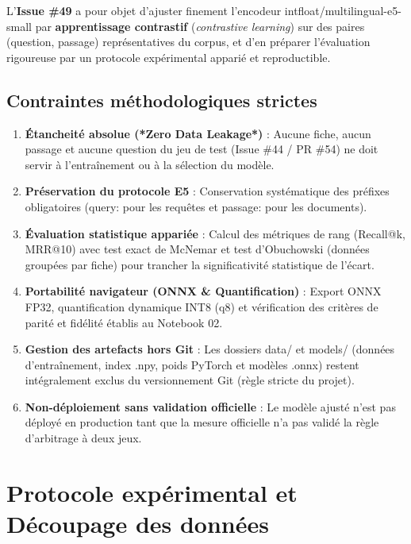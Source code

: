 \documentclass[11pt,a4paper]{article}
\newcommand{\code}[1]  {{\ttfamily #1}}
\newcommand{\rulebreak}{}
\begin{document}
L'\textbf{Issue \#49} a pour objet d'ajuster finement l'encodeur \code{intfloat/\allowbreak{}multilingual-\allowbreak{}e5-\allowbreak{}small} par \textbf{apprentissage contrastif} (\textit{contrastive learning}) sur des paires \code{(question, passage)} représentatives du corpus, et d'en préparer l'évaluation rigoureuse par un protocole expérimental apparié et reproductible.

\subsection{Contraintes méthodologiques strictes}
\begin{enumerate}
\item \textbf{Étancheité absolue (*Zero Data Leakage*)} : Aucune fiche, aucun passage et aucune question du jeu de test (Issue \#44 / PR \#54) ne doit servir à l'entraînement ou à la sélection du modèle.
\item \textbf{Préservation du protocole E5} : Conservation systématique des préfixes obligatoires (\code{query:\allowbreak{} } pour les requêtes et \code{passage:\allowbreak{} } pour les documents).
\item \textbf{Évaluation statistique appariée} : Calcul des métriques de rang (\code{Recall@\allowbreak{}k}, \code{MRR@\allowbreak{}10}) avec test exact de McNemar et test d'Obuchowski (données groupées par fiche) pour trancher la significativité statistique de l'écart.
\item \textbf{Portabilité navigateur (ONNX \& Quantification)} : Export ONNX FP32, quantification dynamique INT8 (\code{q8}) et vérification des critères de parité et fidélité établis au Notebook 02.
\item \textbf{Gestion des artefacts hors Git} : Les dossiers \code{data/\allowbreak{}} et \code{models/\allowbreak{}} (données d'entraînement, index \code{.\allowbreak{}npy}, poids PyTorch et modèles \code{.\allowbreak{}onnx}) restent intégralement exclus du versionnement Git (règle stricte du projet).
\item \textbf{Non-déploiement sans validation officielle} : Le modèle ajusté n'est pas déployé en production tant que la mesure officielle n'a pas validé la règle d'arbitrage à deux jeux.
\end{enumerate}
\rulebreak

\section{Protocole expérimental et Découpage des données}
\end{document}
